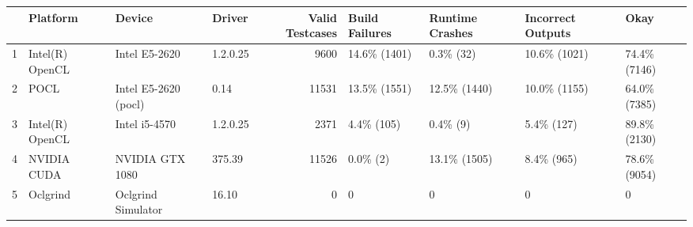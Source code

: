 \begin{tabular}{llllrllll}
\toprule
{} &         Platform &                Device &    Driver &  Valid Testcases & Build Failures & Runtime Crashes & Incorrect Outputs &          Okay \\
\midrule
1 &  Intel(R) OpenCL &         Intel E5-2620 &  1.2.0.25 &             9600 &   14.6\% (1401) &       0.3\% (32) &      10.6\% (1021) &  74.4\% (7146) \\
2 &             POCL &  Intel E5-2620 (pocl) &      0.14 &            11531 &   13.5\% (1551) &    12.5\% (1440) &      10.0\% (1155) &  64.0\% (7385) \\
3 &  Intel(R) OpenCL &         Intel i5-4570 &  1.2.0.25 &             2371 &     4.4\% (105) &        0.4\% (9) &        5.4\% (127) &  89.8\% (2130) \\
4 &      NVIDIA CUDA &       NVIDIA GTX 1080 &    375.39 &            11526 &       0.0\% (2) &    13.1\% (1505) &        8.4\% (965) &  78.6\% (9054) \\
5 &         Oclgrind &    Oclgrind Simulator &     16.10 &                0 &              0 &               0 &                 0 &             0 \\
\bottomrule
\end{tabular}
